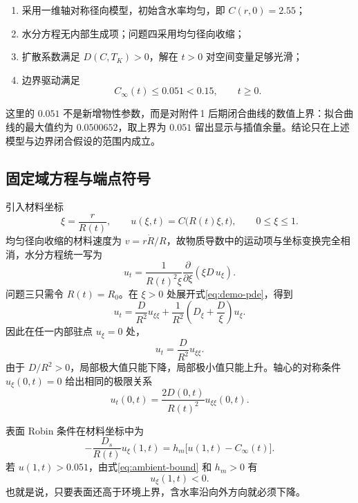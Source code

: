\documentclass[UTF8,a4paper,fontset=fandol]{ctexart}
\numberwithin{equation}{section}
\newcommand{\pd}{\partial}
\newcommand{\crit}{0.15}
\newcommand{\ambmax}{0.051}
\begin{document}
\begin{enumerate}
  \item 采用一维轴对称径向模型，初始含水率均匀，即 $C(r,0)=2.55$；
  \item 水分方程无内部生成项；问题四采用均匀径向收缩；
  \item 扩散系数满足 $D(C,T_K)>0$，解在 $t>0$ 对空间变量足够光滑；
  \item 边界驱动满足
  \begin{equation}
    C_\infty(t)\le \ambmax<\crit,\qquad t\ge0.
    \label{eq:ambient-bound}
  \end{equation}
\end{enumerate}

这里的 $\ambmax$ 不是新增物性参数，而是对附件\,1 后期闭合曲线的数值上界：拟合曲线的最大值约为 $0.0500652$，取上界为 $0.051$ 留出显示与插值余量。结论只在上述模型与边界闭合假设的范围内成立。

\subsection{固定域方程与端点符号}

引入材料坐标
\begin{equation}
  \xi=\frac{r}{R(t)},\qquad u(\xi,t)=C\bigl(R(t)\xi,t\bigr),
  \qquad 0\le\xi\le1.
  \label{eq:demo-coordinate}
\end{equation}
均匀径向收缩的材料速度为 $v=r\dot R/R$，故物质导数中的运动项与坐标变换完全相消，水分方程统一写为
\begin{equation}
  u_t=\frac{1}{R(t)^2\xi}\frac{\pd}{\pd\xi}
  \left(\xi D\,u_\xi\right).
  \label{eq:demo-pde}
\end{equation}
问题三只需令 $R(t)=R_0$。在 $\xi>0$ 处展开式\eqref{eq:demo-pde}，得到
\begin{equation}
  u_t=\frac{D}{R^2}u_{\xi\xi}
  +\frac{1}{R^2}\left(D_\xi+\frac{D}{\xi}\right)u_\xi.
  \label{eq:demo-expanded}
\end{equation}
因此在任一内部驻点 $u_\xi=0$ 处，
\begin{equation}
  u_t=\frac{D}{R^2}u_{\xi\xi}.
  \label{eq:demo-extremum}
\end{equation}
由于 $D/R^2>0$，局部极大值只能下降，局部极小值只能上升。轴心的对称条件 $u_\xi(0,t)=0$ 给出相同的极限关系
\begin{equation}
  u_t(0,t)=\frac{2D(0,t)}{R(t)^2}u_{\xi\xi}(0,t).
  \label{eq:demo-center}
\end{equation}

表面 Robin 条件在材料坐标中为
\begin{equation}
  -\frac{D_s}{R(t)}u_\xi(1,t)
  =h_m\bigl[u(1,t)-C_\infty(t)\bigr].
  \label{eq:demo-robin}
\end{equation}
若 $u(1,t)>\ambmax$，由式\eqref{eq:ambient-bound} 和 $h_m>0$ 有
\begin{equation}
  u_\xi(1,t)<0.
  \label{eq:demo-surface-sign}
\end{equation}
也就是说，只要表面还高于环境上界，含水率沿向外方向就必须下降。
\end{document}
